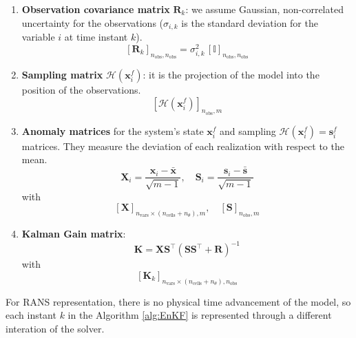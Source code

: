 \begin{enumerate}
  \item \textbf{Observation covariance matrix} $\mathbf{R}_k$: we assume Gaussian, non-correlated uncertainty for the observations ($\sigma_{i,k}$ is the standard deviation for the variable $i$ at time instant $k$).
  \[
  [\mathbf{R}_k]_{n_{\text{obs}}, n_{\text{obs}}} = \sigma_{i,k}^2 \, [\mathbb{I}]_{n_{\text{obs}}, n_{\text{obs}}}
  \]

  \item \textbf{Sampling matrix} $\mathcal{H} \left( \mathbf{x}_i^f \right)$: it is the projection of the model into the position of the observations.
  \[
  \left[ \mathcal{H} \left( \mathbf{x}_i^f \right) \right]_{n_{\text{obs}}, m}
  \]

  \item \textbf{Anomaly matrices} for the system's state $\mathbf{x}_i^f$ and sampling $\mathcal{H} \left( \mathbf{x}_i^f \right) = \mathbf{s}_i^f$ matrices. They measure the deviation of each realization with respect to the mean.
  \[
  \mathbf{X}_i = \frac{\mathbf{x}_i - \bar{\mathbf{x}}}{\sqrt{m-1}}, \quad 
  \mathbf{S}_i = \frac{\mathbf{s}_i - \bar{\mathbf{s}}}{\sqrt{m-1}}
  \]
  with
  \[
  [\mathbf{X}]_{n_{\text{vars}} \times (n_{\text{cells}} + n_{\theta}), m}, \quad 
  [\mathbf{S}]_{n_{\text{obs}}, m}
  \]

  \item \textbf{Kalman Gain matrix}:
  \[
  \mathbf{K} = \mathbf{X} \mathbf{S}^\top \left( \mathbf{S} \mathbf{S}^\top + \mathbf{R} \right)^{-1}
  \]
  with
  \[
  [\mathbf{K}_k]_{n_{\text{vars}} \times (n_{\text{cells}} + n_{\theta}), n_{\text{obs}}}
  \]
\end{enumerate}







For RANS representation, there is no physical time advancement of the model, so each instant $k$ in the Algorithm \ref{alg:EnKF} is represented through a different interation of the solver.%

